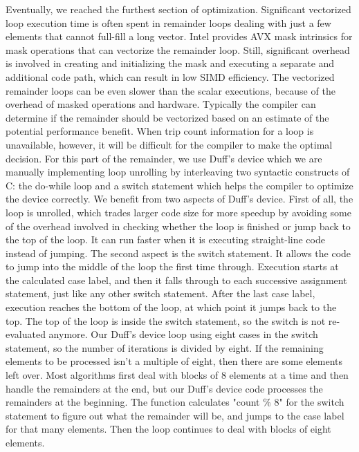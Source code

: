 \documentclass[sigconf]{acmart}
\begin{document}
Eventually, we reached the furthest section of optimization.
Significant vectorized loop execution time is often spent in remainder
loops dealing with just a few elements that cannot full-fill a long vector.
Intel provides AVX mask intrinsics for mask operations that can vectorize the remainder loop.
Still, significant overhead is involved in creating and initializing the mask and
executing a separate and additional code path, which can result in low SIMD efficiency.
The vectorized remainder loops can be even slower than the scalar executions,
because of the overhead of masked operations and hardware.
Typically the compiler can determine if the remainder should be vectorized
based on an estimate of the potential performance benefit. When trip count information for a
loop is unavailable, however, it will be difficult for the
compiler to make the optimal decision.
For this part of the remainder, we use Duff's device which we are manually implementing
loop unrolling by interleaving two syntactic constructs of C: the do-while loop
and a switch statement which helps the compiler to optimize the device correctly.
We benefit from two aspects of Duff's device. First of all, the loop is unrolled,
which trades larger code size for more speedup by avoiding some of the overhead
involved in checking whether the loop is finished or jump back to the
top of the loop. It can run faster when it is executing straight-line code instead of jumping.
The second aspect is the switch statement. It allows the code to jump into the middle of the
loop the first time through.
Execution starts at the calculated case label, and then it falls through to each successive
assignment statement, just like any other switch statement. After the last case label, execution reaches the bottom of the loop, at which point it jumps back to the top. The top of the loop is inside the switch statement, so the switch is not re-evaluated anymore.
Our Duff's device loop using eight cases in the switch statement, so the number of iterations is divided by eight.
If the remaining elements to be processed isn't a multiple of eight, then there are some elements left over.
Most algorithms first deal with blocks of 8 elements at a time and then handle the remainders at the end,
but our Duff's device code processes the remainders at the beginning. The function calculates "count \% 8" for the switch statement to figure out what the remainder will be, and jumps to the case label for that many elements.
Then the loop continues to deal with blocks of eight elements.
\end{document}
